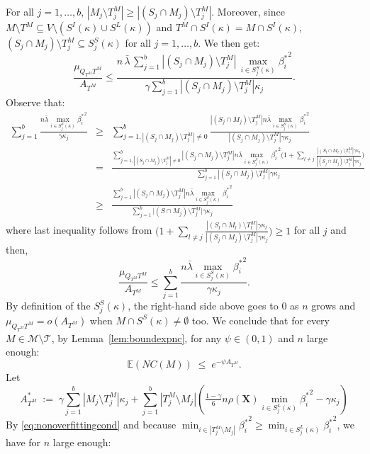 \documentclass[aos]{imsart}
\theoremstyle{plain}
\newcommand{\E}{\mathbb{E}}
\newcommand{\T}{\mathcal{T}}
\newcommand{\bs}{\boldsymbol}
\begin{document}
For all $j=1,\ldots,b$, $|M_j \setminus T^M_j| \geq |(S_j\cap M_j )\setminus T^M_j|$. Moreover, since  $M\setminus T^M\subseteq V\setminus (S^{I}(\kappa) \cup S^L(\kappa))$ and $T^M\cap S^{I}(\kappa)=M\cap S^{I}(\kappa)$, $(S_j\cap M_j )\setminus T^M_j \subseteq S^{S}_j(\kappa)$ for all $j=1,\ldots,b$. We then get:
$$\frac{\mu_{Q_{T^M} T^M}}{ A_{T^M}} \leq \frac{n\,\bar{\lambda}\,\sum_{j=1}^b|(S_j\cap M_j )\setminus T^M_j|\,\max_{i\in S^{S}_j(\kappa)}{\beta_{i}^*}^2}{ \gamma\sum_{j=1}^b|(S_j\cap M_j ) \setminus T^M_j|\kappa_j}.$$
Observe that:
\begin{eqnarray*}
    \sum_{j=1}^b\frac{n\bar{\lambda}\max_{i\in S^{S}_j(\kappa)}{\beta_i^*}^2}{\gamma\kappa_j}
    &\geq &\sum_{j=1,|(S_j\cap M_j )\setminus T^M_j|\neq 0}^b\frac{|(S_j\cap M_j )\setminus T^M_j|n\bar{\lambda}\max_{i\in S^{S}_j(\kappa)}{\beta_i^*}^2}{|(S_j\cap M_j )\setminus T^M_j|\gamma\kappa_j} \\
    &=& \frac{\sum_{j=1,|(S_j\cap M_j )\setminus T^M_j|\neq 0 }^b|(S_j\cap M_j )\setminus T^M_j|n\bar{\lambda}\max_{i\in S^{S}_j(\kappa)}{\beta_i^*}^2\Big(1+\sum_{l\neq j}\frac{|(S_l\cap M_l)\setminus T^M_l|\gamma\kappa_l}{|(S_j\cap M_j )\setminus T^M_j|\gamma\kappa_j}\Big)}{\sum_{j=1}^b|(S_j\cap M_j )\setminus T^M_j|\gamma\kappa_j} \\
    &\geq & \frac{\sum_{j=1}^b|(S_j\cap M_j )\setminus T^M_j|n\bar{\lambda}\max_{i\in S^{S}_j(\kappa)}{\beta_i^*}^2}{\sum_{j=1}^b \big|(S\cap M_j)\setminus T^M_j\big|\gamma\kappa_j} 
\end{eqnarray*}
where last inequality follows from $\Big(1+\sum_{l\neq j}\frac{|(S_l\cap M_l)\setminus T^M_l|\gamma\kappa_l}{|(S_j\cap M_j )\setminus T^M_j|\gamma\kappa_j}\Big)\geq 1$ for all $j$ and then,
$$\frac{\mu_{Q_{T^M} T^M}}{ A_{T^M}} \leq \sum_{j=1}^b\frac{n\bar{\lambda}\max_{i\in S^{S}_j(\kappa)}{\beta_i^*}^2}{\gamma\kappa_j}.$$
By definition of the $S_j^{S}(\kappa)$, the right-hand side above goes to 0 as $n$ grows and $\mu_{Q_{T^M} T^M}=o(A_{T^M})$ when $M\cap S^{S}(\kappa)\neq\emptyset$ too. 
We conclude that for every $M\in \mathcal M\setminus \T$, by Lemma~\ref{lem:boundexpnc}, for any $\psi\in(0,1)$ and $n$ large enough:
$$
\E(NC(M))\;\leq\;e^{-\psi A_{T^M}}.
$$
Let 
$$A_{T^M}^*\;:=\;\gamma\sum_{j=1}^b|M_j \setminus T^M_j|\kappa_j + \sum_{j=1}^b |T^M_j\setminus M_j |\left(\tfrac{1-\gamma}{6} n \rho(\bs X) \min_{i\in S^{L}_j(\kappa)}{\beta^*_i}^{2} - \gamma\kappa_j\right) $$
By \eqref{eq:nonoverfittingcond} and because $\min_{i\in |T^M_j\setminus M_j|}{\beta^*_i}^{2}\geq \min_{i\in S^{L}_j(\kappa)}{\beta^*_i}^{2}$, we have for $n$ large enough:
\end{document}
